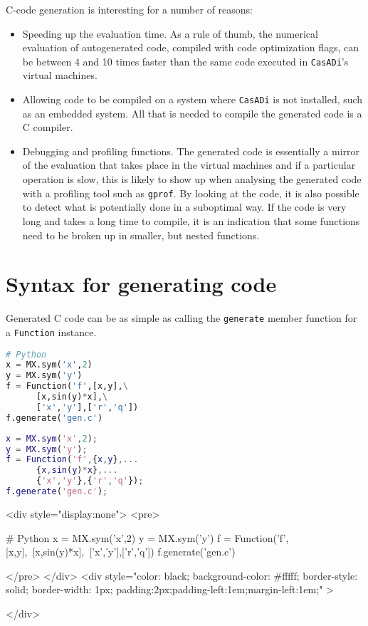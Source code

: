 \documentclass[a4paper,12pt]{book}
\newcommand{\CasADi}{\texttt{CasADi}\xspace}
\newcounter{pytexcount}
\newcounter{pytexsubcount}
\renewenvironment{pytexoutput}
{\addtocounter{pytexsubcount}{1}%
\begin{rawhtml}
<div style="display:none">
<pre>
\end{rawhtml}
}%
{\begin{rawhtml}
</pre>
</div>
<div style="color: black; background-color: \#fffff;  border-style: solid; border-width: 1px; padding:2px;padding-left:1em;margin-left:1em;" >\end{rawhtml}%
\verbatiminputeval{pytex_\alph{pytexcount}_\arabic{pytexsubcount}.log}%
\begin{rawhtml}
</div>
\end{rawhtml}
}
\begin{document}
C-code generation is interesting for a number of reasons:
\begin{itemize}
\item Speeding up the evaluation time. As a rule of thumb, the numerical evaluation of
autogenerated code, compiled with code optimization flags, can be between 4 and 10 times faster than
the same code executed in \CasADi's virtual machines.
\item Allowing code to be compiled on a system where \CasADi is not installed, such as an embedded system.
All that is needed to compile the generated code is a C compiler.
\item Debugging and profiling functions.
The generated code is essentially a mirror of the evaluation that takes place in the virtual machines and
if a particular operation is slow, this is likely to show up when analysing the generated code with a
profiling tool such as \texttt{gprof}. By looking at the code, it is also possible to detect what is
potentially done in a suboptimal way. If the code is very long and takes a long time to compile,
it is an indication that some functions need to be broken up in smaller, but nested functions.
\end{itemize}

\section{Syntax for generating code} \label{sec:codegen_syntax}
Generated C code can be as simple as calling the \texttt{generate} member function for a \texttt{Function} instance.

\begin{minipage}[t]{0.5\textwidth}
\begin{lstlisting}[language=Python]
# Python
x = MX.sym('x',2)
y = MX.sym('y')
f = Function('f',[x,y],\
      [x,sin(y)*x],\
      ['x','y'],['r','q'])
f.generate('gen.c')
\end{lstlisting}
\end{minipage}
\begin{minipage}[t]{0.5\textwidth}
\begin{lstlisting}[language=Matlab]
% MATLAB
x = MX.sym('x',2);
y = MX.sym('y');
f = Function('f',{x,y},...
      {x,sin(y)*x},...
      {'x','y'},{'r','q'});
f.generate('gen.c');
\end{lstlisting}
\end{minipage}
\begin{pytexoutput}
# Python
x = MX.sym('x',2)
y = MX.sym('y')
f = Function('f',[x,y],\
      [x,sin(y)*x],\
      ['x','y'],['r','q'])
f.generate('gen.c')
\end{pytexoutput}
\end{document}
